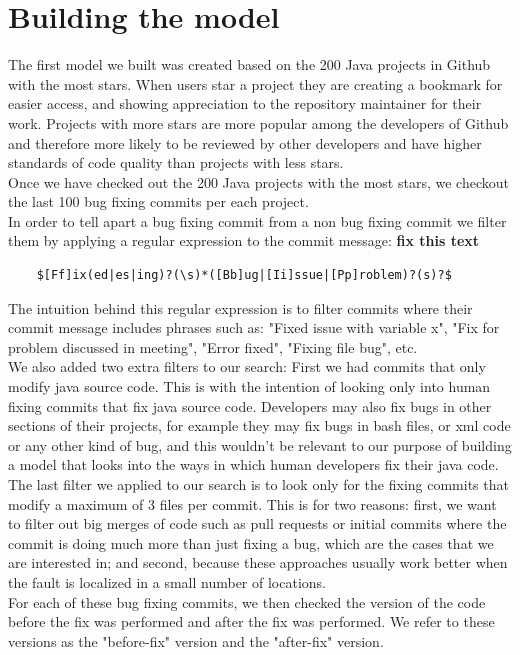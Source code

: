 \documentclass[conference]{IEEEtran}
\newcommand{\todo}[1]
  {{\scriptsize \textbf{\color{red} {#1}}}}
\begin{document}
{{\section{Building the model}
The first model we built was created based on the 200 Java projects in Github with the most stars. When users star a project they are creating a bookmark for easier access, and showing appreciation to the repository maintainer for their work. Projects with more stars are more popular among the developers of Github and therefore more likely to be reviewed by other developers and have higher standards of code quality than projects with less stars.\\
Once we have checked out the 200 Java projects with the most stars, we checkout the last 100 bug fixing commits per each project. \\
In order to tell apart a bug fixing commit from a non bug fixing commit we filter them by applying a regular expression to the commit message:
\todo{fix this text}
\begin{verbatim}
    $[Ff]ix(ed|es|ing)?(\s)*([Bb]ug|[Ii]ssue|[Pp]roblem)?(s)?$
\end{verbatim}
The intuition behind this regular expression is to filter commits where their commit message includes phrases such as: "Fixed issue with variable x", "Fix for problem discussed in meeting", "Error fixed", "Fixing file bug", etc.\\
We also added two extra filters to our search: First we had commits that only modify java source code. This is with the intention of looking only into human fixing commits that fix java source code. Developers may also fix bugs in other sections of their projects, for example they may fix bugs in bash files, or xml code or any other kind of bug, and this wouldn't be relevant to our purpose of building a model that looks into the ways in which human developers fix their java code.\\
The last filter we applied to our search is to look only for the fixing commits that modify a maximum of 3 files per commit. This is for two reasons: first, we want to filter out big merges of code such as pull requests or initial commits where the commit is doing much more than just fixing a bug, which are the cases that we are interested in; and second, because these approaches usually work better when the fault is localized in a small number of locations.\\
For each of these bug fixing commits, we then checked the version of the code before the fix was performed and after the fix was performed. We refer to these versions as the "before-fix" version and the "after-fix" version.\\
}}
\end{document}
